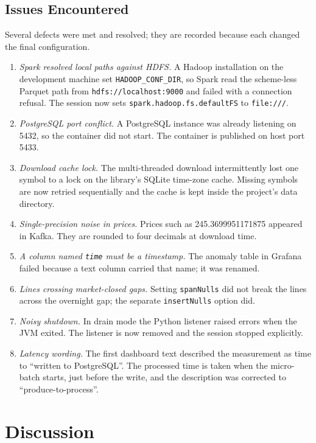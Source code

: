 \documentclass[conference]{IEEEtran}
\newcommand{\code}[1]{\texttt{#1}}
\begin{document}
\subsection{Issues Encountered}
Several defects were met and resolved; they are recorded because each changed the final configuration.
\begin{enumerate}
\item \emph{Spark resolved local paths against HDFS.} A Hadoop installation on the development machine set \code{HADOOP\_CONF\_DIR}, so Spark read the scheme-less Parquet path from \code{hdfs://localhost:9000} and failed with a connection refusal. The session now sets \code{spark.hadoop.fs.defaultFS} to \code{file:///}.
\item \emph{PostgreSQL port conflict.} A PostgreSQL instance was already listening on 5432, so the container did not start. The container is published on host port 5433.
\item \emph{Download cache lock.} The multi-threaded download intermittently lost one symbol to a lock on the library's SQLite time-zone cache. Missing symbols are now retried sequentially and the cache is kept inside the project's data directory.
\item \emph{Single-precision noise in prices.} Prices such as 245.3699951171875 appeared in Kafka. They are rounded to four decimals at download time.
\item \emph{A column named \code{time} must be a timestamp.} The anomaly table in Grafana failed because a text column carried that name; it was renamed.
\item \emph{Lines crossing market-closed gaps.} Setting \code{spanNulls} did not break the lines across the overnight gap; the separate \code{insertNulls} option did.
\item \emph{Noisy shutdown.} In drain mode the Python listener raised errors when the JVM exited. The listener is now removed and the session stopped explicitly.
\item \emph{Latency wording.} The first dashboard text described the measurement as time to ``written to PostgreSQL''. The processed time is taken when the micro-batch starts, just before the write, and the description was corrected to ``produce-to-process''.
\end{enumerate}

\section{Discussion}
\end{document}
